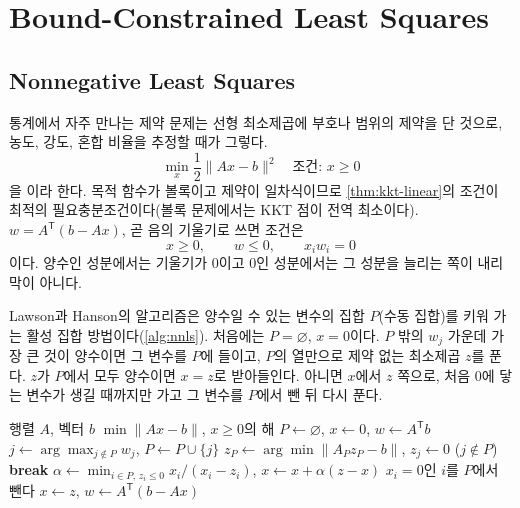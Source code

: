 \section{Bound-Constrained Least Squares}
\label{sec:bounded-lsq}

\subsection{Nonnegative Least Squares}

통계에서 자주 만나는 제약 문제는 선형 최소제곱에 부호나 범위의 제약을 단 것으로, 농도, 강도, 혼합 비율을 추정할 때가 그렇다.
\[
\min_x\frac12\|Ax-b\|^2\quad\text{조건: }x\ge0
\]
을 이라 한다. 목적 함수가 볼록이고 제약이 일차식이므로 \cref{thm:kkt-linear}의 조건이 최적의 필요충분조건이다(볼록 문제에서는 KKT 점이 전역 최소이다). $w=A^{\mathsf T}(b-Ax)$, 곧 음의 기울기로 쓰면 조건은
\[
x\ge0,\qquad w\le0,\qquad x_iw_i=0
\]
이다. 양수인 성분에서는 기울기가 $0$이고 $0$인 성분에서는 그 성분을 늘리는 쪽이 내리막이 아니다.

Lawson과 Hanson의 알고리즘\cite{lawson1995}은 양수일 수 있는 변수의 집합 $P$(수동 집합)를 키워 가는 활성 집합 방법이다(\cref{alg:nnls}). 처음에는 $P=\varnothing$, $x=0$이다. $P$ 밖의 $w_j$ 가운데 가장 큰 것이 양수이면 그 변수를 $P$에 들이고, $P$의 열만으로 제약 없는 최소제곱 $z$를 푼다. $z$가 $P$에서 모두 양수이면 $x=z$로 받아들인다. 아니면 $x$에서 $z$ 쪽으로, 처음 $0$에 닿는 변수가 생길 때까지만 가고 그 변수를 $P$에서 뺀 뒤 다시 푼다.

\begin{algorithm}[t]
\begin{algorithmic}[1]
\Require 행렬 $A$, 벡터 $b$
\Ensure $\min\|Ax-b\|$, $x\ge0$의 해
\State $P\gets\varnothing$, $x\gets0$, $w\gets A^{\mathsf T}b$
  \State $j\gets\arg\max_{j\notin P}w_j$, $P\gets P\cup\{j\}$
  \Loop
    \State $z_P\gets\arg\min\|A_Pz_P-b\|$, $z_j\gets0$ ($j\notin P$) 
     \State \textbf{break} \EndIf
    \State $\alpha\gets\min_{i\in P,\,z_i\le0}x_i/(x_i-z_i)$, $x\gets x+\alpha(z-x)$
    \State $x_i=0$인 $i$를 $P$에서 뺀다
  \EndLoop
  \State $x\gets z$, $w\gets A^{\mathsf T}(b-Ax)$
\EndWhile
\end{algorithmic}
\caption{Lawson--Hanson의 NNLS}
\label{alg:nnls}
\end{algorithm}

